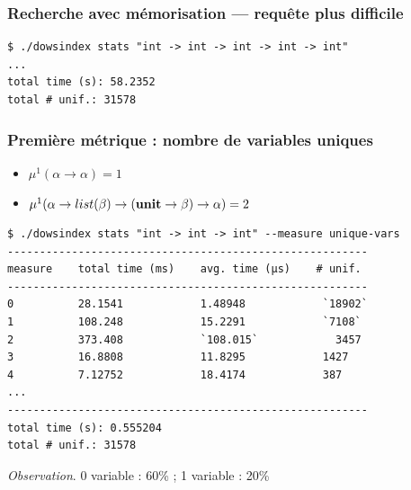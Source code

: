 \documentclass[serif]{beamer}
\newcommand{\unit}{\bold{unit}}
\begin{document}

\begin{frame}[fragile=singleslide]\frametitle{Recherche avec mémorisation — requête plus difficile}
\begin{verbatim}
$ ./dowsindex stats "int -> int -> int -> int -> int"
...
total time (s): 58.2352
total # unif.: 31578
\end{verbatim}
\end{frame}


\begin{frame}[fragile=singleslide]\frametitle{Première métrique : nombre de variables uniques}
\scriptsize
\begin{itemize}
	\item $\mu^1 (\alpha \rightarrow \alpha) = 1$
	\item $\mu^1 (\alpha \rightarrow list (\beta) \rightarrow (\unit \rightarrow \beta) \rightarrow \alpha) = 2$
\end{itemize}
\begin{lstlisting}
$ ./dowsindex stats "int -> int -> int" --measure unique-vars
--------------------------------------------------------
measure    total time (ms)    avg. time (µs)    # unif.
--------------------------------------------------------
0          28.1541            1.48948            `18902`
1          108.248            15.2291            `7108`
2          373.408            `108.015`            3457
3          16.8808            11.8295            1427
4          7.12752            18.4174            387
...
--------------------------------------------------------
total time (s): 0.555204
total # unif.: 31578
\end{lstlisting}
\textit{Observation}. 0 variable : 60\% ; 1 variable : 20\%
\end{frame}

\end{document}
